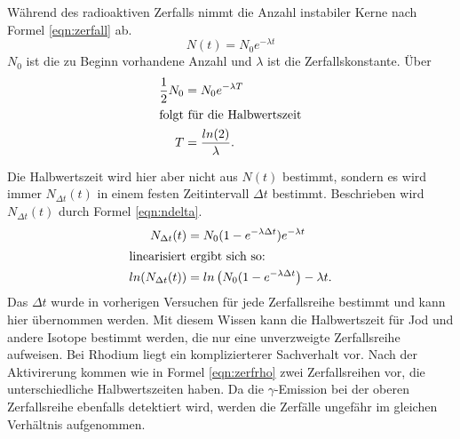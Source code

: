 Während des radioaktiven Zerfalls nimmt die Anzahl instabiler Kerne nach
Formel \eqref{eqn:zerfall} ab.
\begin{equation}
  N(t) = N_0 e^{-\lambda t}
  \label{eqn:zerfall}
\end{equation}
$N_0$ ist die zu Beginn vorhandene Anzahl und $\lambda$ ist die Zerfallskonstante.
Über
\begin{align}
  \frac{1}{2} N_0 &= N_0 e^{-\lambda T}\\
  \intertext{folgt für die Halbwertszeit}
  T &= \frac{ln(2)}{\lambda}.
\end{align}

Die Halbwertszeit wird hier aber nicht aus $N(t)$ bestimmt, sondern es wird immer
$N_{\Delta t}(t)$ in einem festen Zeitintervall $\Delta t$ bestimmt.
Beschrieben wird $N_{\Delta t}(t)$ durch Formel \eqref{eqn:ndelta}.
\begin{align}
  N_{\Delta t}(t) &= N_0(1 - e^{-\lambda\Delta t}) e^{-\lambda t} \label{eqn:ndelta}\\
  \intertext{linearisiert ergibt sich so:}
  ln(N_{\Delta t}(t)) &= ln\left( N_0(1-e^{-\lambda\Delta t}\right) - \lambda t \label{eqn:ndeltalinear}.
\end{align}
Das $\Delta t$ wurde in vorherigen Versuchen für jede Zerfallsreihe bestimmt und kann hier übernommen
werden. Mit diesem Wissen kann die Halbwertszeit für Jod und andere Isotope bestimmt werden,
die nur eine unverzweigte Zerfallsreihe aufweisen.
Bei Rhodium liegt ein komplizierterer Sachverhalt vor. Nach der Aktivirerung kommen
wie in Formel \eqref{eqn:zerfrho} zwei Zerfallsreihen vor, die unterschiedliche Halbwertszeiten
haben. Da die $\gamma$-Emission bei der oberen Zerfallsreihe ebenfalls detektiert wird,
werden die Zerfälle ungefähr im gleichen Verhältnis aufgenommen.

